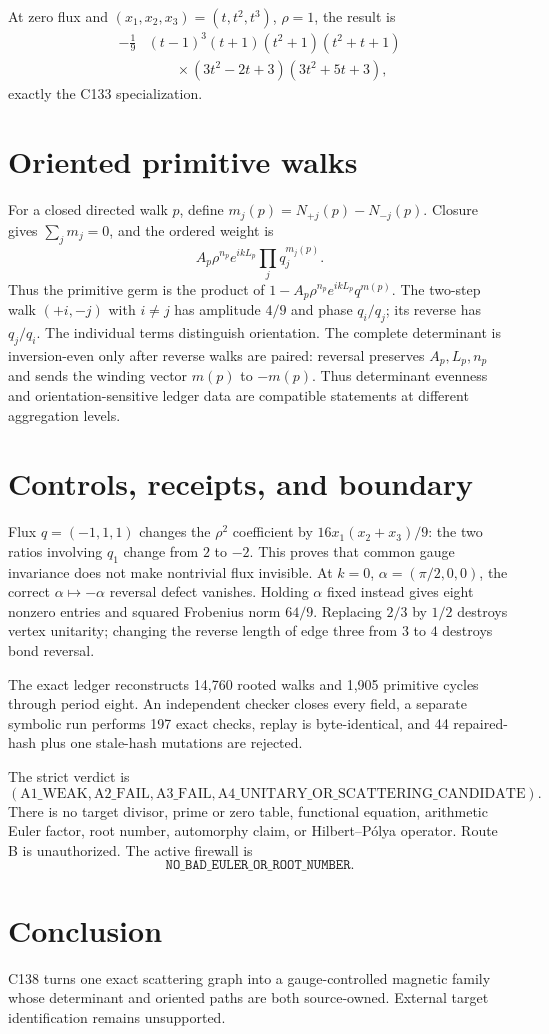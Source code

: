 \documentclass[11pt]{article}
\begin{document}
At zero flux and $(x_1,x_2,x_3)=(t,t^2,t^3)$, $\rho=1$, the result is
\begin{align}\label{eq:zero}
 -\frac19&(t-1)^3(t+1)(t^2+1)(t^2+t+1)\nonumber\\
 &\qquad\times(3t^2-2t+3)(3t^2+5t+3),
\end{align}
exactly the C133 specialization.

\section{Oriented primitive walks}
For a closed directed walk $p$, define
$m_j(p)=N_{+j}(p)-N_{-j}(p)$.  Closure gives $\sum_jm_j=0$, and the ordered
weight is
\[
 A_p\rho^{n_p}e^{ikL_p}\prod_jq_j^{m_j(p)}.
\]
Thus the primitive germ is the product of
$1-A_p\rho^{n_p}e^{ikL_p}q^{m(p)}$.  The two-step walk $(+i,-j)$ with
$i\ne j$ has amplitude $4/9$ and phase $q_i/q_j$; its reverse has
$q_j/q_i$.  The individual terms distinguish orientation.  The complete
determinant is inversion-even only after reverse walks are paired: reversal
preserves $A_p,L_p,n_p$ and sends the winding vector $m(p)$ to $-m(p)$.
Thus determinant evenness and orientation-sensitive ledger data are
compatible statements at different aggregation levels.

\section{Controls, receipts, and boundary}
Flux $q=(-1,1,1)$ changes the $\rho^2$ coefficient by
$16x_1(x_2+x_3)/9$: the two ratios involving $q_1$ change from $2$ to
$-2$.  This proves that common gauge invariance does not make nontrivial
flux invisible.  At $k=0$, $\alpha=(\pi/2,0,0)$, the correct
$\alpha\mapsto-\alpha$ reversal defect vanishes.  Holding $\alpha$ fixed
instead gives eight nonzero entries and squared Frobenius norm $64/9$.
Replacing $2/3$ by $1/2$ destroys vertex unitarity; changing the reverse
length of edge three from $3$ to $4$ destroys bond reversal.

The exact ledger reconstructs 14,760 rooted walks and 1,905 primitive cycles
through period eight.  An independent checker closes every field, a separate
symbolic run performs 197 exact checks, replay is byte-identical, and 44
repaired-hash plus one stale-hash mutations are rejected.

The strict verdict is
\[
 (\mathrm{A1\_WEAK},\mathrm{A2\_FAIL},\mathrm{A3\_FAIL},
 \mathrm{A4\_UNITARY\_OR\_SCATTERING\_CANDIDATE}).
\]
There is no target divisor, prime or zero table, functional equation,
arithmetic Euler factor, root number, automorphy claim, or Hilbert--P\'olya
operator.  Route B is unauthorized.  The active firewall is
\[
 \texttt{NO\_BAD\_EULER\_OR\_ROOT\_NUMBER}.
\]

\section{Conclusion}
C138 turns one exact scattering graph into a gauge-controlled magnetic family
whose determinant and oriented paths are both source-owned.  External target
identification remains unsupported.
\end{document}

